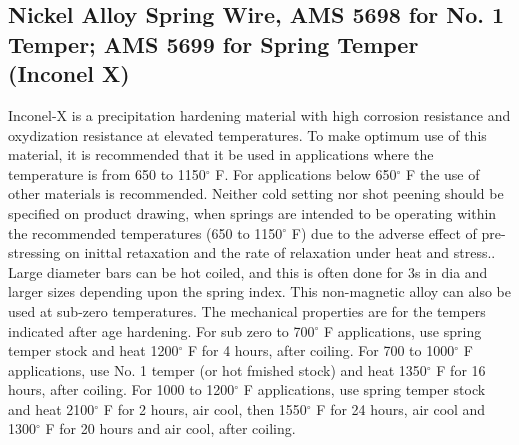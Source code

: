 \documentclass[10pt]{article}
\begin{document}
\subsection{Nickel Alloy Spring Wire, AMS 5698 for No. 1 Temper; AMS 5699 for Spring Temper (Inconel X)} %
Inconel-X is a precipitation hardening material with high corrosion resistance and oxydization resistance at elevated temperatures. 
To make optimum use of this material, it is recommended that it be used in applications where the temperature is from 650 to 1150$^\circ$ F. 
For applications below 650$^\circ$ F the use of other materials is recommended. 
Neither cold setting nor shot peening should be specified on product drawing, when springs are intended to be operating
within the recommended temperatures (650 to 1150$^\circ$ F) due to the adverse effect of pre-stressing on inittal retaxation and the rate of relaxation under heat and stress.. 
Large diameter bars can be hot coiled, and this is often done for 3s in dia and larger sizes depending upon the spring index.
This non-magnetic alloy can also be used at sub-zero temperatures. 
The mechanical properties are for the tempers indicated after age hardening. 
For sub zero to 700$^\circ$ F applications, use spring temper stock and heat 1200$^\circ$ F for 4 hours, after coiling. 
For 700 to 1000$^\circ$ F applications, use No. 1 temper (or hot fmished stock) and heat 1350$^\circ$ F for 16 hours, after coiling. 
For 1000 to 1200$^\circ$ F applications, use spring temper stock and heat 2100$^\circ$ F for 2 hours, air cool, then 1550$^\circ$ F for 24 hours, air cool and 1300$^\circ$ F for 20 hours and air cool, after coiling.
\end{document}
